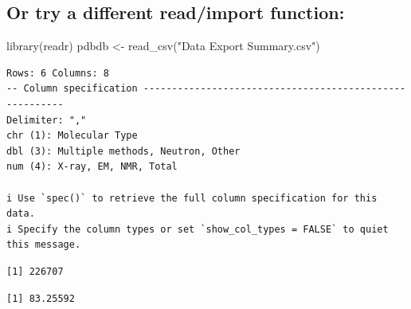 \documentclass[
  letterpaper,
  DIV=11,
  numbers=noendperiod]{scrartcl}
\newenvironment{Shaded}{\begin{snugshade}}{\end{snugshade}}
\newcommand{\AttributeTok}[1]{\textcolor[rgb]{0.40,0.45,0.13}{#1}}
\newcommand{\DecValTok}[1]{\textcolor[rgb]{0.68,0.00,0.00}{#1}}
\newcommand{\FunctionTok}[1]{\textcolor[rgb]{0.28,0.35,0.67}{#1}}
\newcommand{\NormalTok}[1]{\textcolor[rgb]{0.00,0.23,0.31}{#1}}
\newcommand{\OtherTok}[1]{\textcolor[rgb]{0.00,0.23,0.31}{#1}}
\newcommand{\SpecialCharTok}[1]{\textcolor[rgb]{0.37,0.37,0.37}{#1}}
\newcommand{\StringTok}[1]{\textcolor[rgb]{0.13,0.47,0.30}{#1}}
\begin{document}
\subsection{Or try a different read/import
function:}\label{or-try-a-different-readimport-function}

\begin{Shaded}
\begin{Highlighting}[]
\FunctionTok{library}\NormalTok{(readr)}
\NormalTok{pdbdb }\OtherTok{\textless{}{-}} \FunctionTok{read\_csv}\NormalTok{(}\StringTok{"Data Export Summary.csv"}\NormalTok{)}
\end{Highlighting}
\end{Shaded}

\begin{verbatim}
Rows: 6 Columns: 8
-- Column specification --------------------------------------------------------
Delimiter: ","
chr (1): Molecular Type
dbl (3): Multiple methods, Neutron, Other
num (4): X-ray, EM, NMR, Total

i Use `spec()` to retrieve the full column specification for this data.
i Specify the column types or set `show_col_types = FALSE` to quiet this message.
\end{verbatim}

\begin{Shaded}
\end{Shaded}

\begin{verbatim}
[1] 226707
\end{verbatim}

\begin{Shaded}
\end{Shaded}

\begin{verbatim}
[1] 83.25592
\end{verbatim}

\begin{Shaded}
\end{Shaded}
\end{document}
